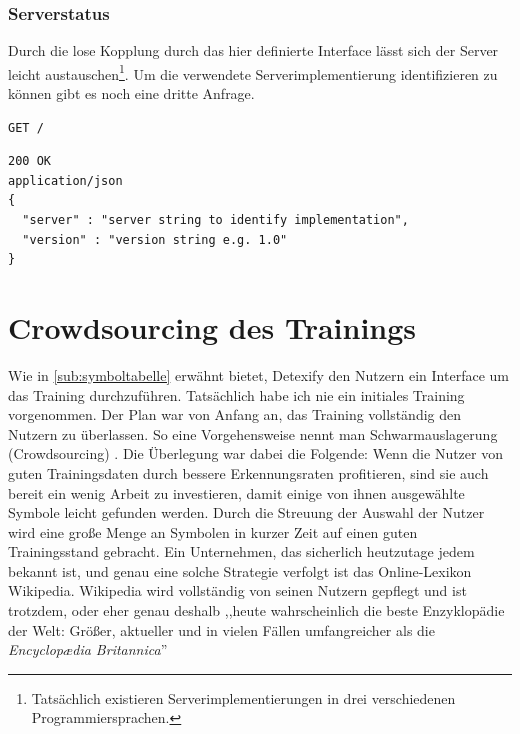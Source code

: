 \subsubsection{Serverstatus}

Durch die lose Kopplung durch das hier definierte Interface lässt sich der Server leicht austauschen\footnote{Tatsächlich existieren Serverimplementierungen in drei verschiedenen Programmiersprachen.}. Um die verwendete Serverimplementierung identifizieren zu können gibt es noch eine dritte Anfrage.

\begin{lstlisting}[caption={Anfrage}]
GET /
\end{lstlisting}
\begin{lstlisting}[caption={Antwort}]
200 OK
application/json
{
  "server" : "server string to identify implementation",
  "version" : "version string e.g. 1.0"
}
\end{lstlisting}




\section{Crowdsourcing des Trainings} %
\label{sec:crowdsourcing}

Wie in \ref{sub:symboltabelle} erwähnt bietet, Detexify den Nutzern ein Interface um das Training durchzuführen. Tatsächlich habe ich nie ein initiales Training vorgenommen. Der Plan war von Anfang an, das Training vollständig den Nutzern zu überlassen. So eine Vorgehensweise nennt man Schwarmauslagerung (Crowdsourcing) \cite{Howe:2006p11814}. Die Überlegung war dabei die Folgende: Wenn die Nutzer von guten Trainingsdaten durch bessere Erkennungsraten profitieren, sind sie auch bereit ein wenig Arbeit zu investieren, damit einige von ihnen ausgewählte Symbole leicht gefunden werden. Durch die Streuung der Auswahl der Nutzer wird eine große Menge an Symbolen in kurzer Zeit auf einen guten Trainingsstand gebracht. Ein Unternehmen, das sicherlich heutzutage jedem bekannt ist, und genau eine solche Strategie verfolgt ist das Online-Lexikon Wikipedia. Wikipedia wird vollständig von seinen Nutzern gepflegt und ist trotzdem, oder eher genau deshalb ,,heute wahrscheinlich die beste Enzyklopädie der Welt: Größer, aktueller und in vielen Fällen umfangreicher als die \emph{Encyclop\ae dia Britannica}'' \citep[S.77-86]{andersen2006long}

